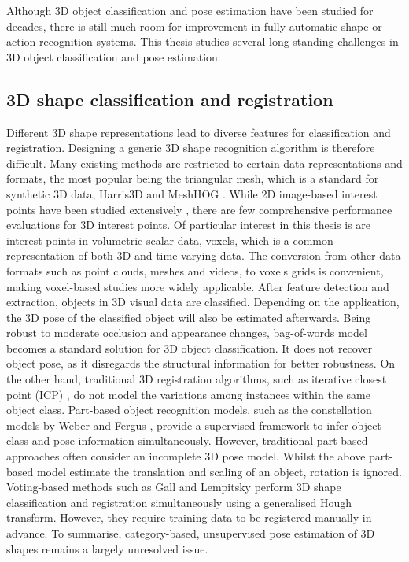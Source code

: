 Although 3D object classification and pose estimation have been studied for decades, there is still much room for improvement in fully-automatic shape or action recognition systems. 
This thesis studies several long-standing challenges in 3D object classification and pose estimation.  

\subsection{3D shape classification and registration} 

Different 3D shape representations lead to diverse features for classification and registration. Designing a generic 3D shape recognition algorithm is therefore difficult. Many existing methods are restricted to certain data representations and formats, the most popular being the triangular mesh, which is a standard for synthetic 3D data, \eg Harris3D \cite{Sipiran2011} and MeshHOG \cite{Zaharescu2009}.     
While 2D image-based interest points have been studied extensively \cite{Mikolajczyk2005}, there are few comprehensive performance evaluations for 3D interest points. 
Of particular interest in this thesis is are interest points in volumetric scalar data, \ie voxels, which is a common representation of both 3D and time-varying data. 
The conversion from other data formats such as point clouds, meshes and videos, to voxels grids is convenient, making voxel-based studies more widely applicable. 
After feature detection and extraction, objects in 3D visual data are classified.  
Depending on the application, the 3D pose of the classified object will also be estimated afterwards. 
Being robust to moderate occlusion and appearance changes, bag-of-words model becomes a standard solution for 3D object classification. It does not recover object pose, as it disregards the structural information for better robustness. 
On the other hand, traditional 3D registration algorithms, such as iterative closest point (ICP) \cite{Besl1992}, do not model the variations among instances within the same object class.
Part-based object recognition models, such as the constellation models by Weber \etal \cite{Weber2000} and Fergus \etal \cite{Fergus2007}, provide a supervised framework to infer object class and pose information simultaneously. However, traditional part-based approaches often consider an incomplete 3D pose model. Whilst the above part-based model estimate the translation and scaling of an object, rotation is ignored.      
Voting-based methods such as Gall and Lempitsky \cite{Gall2009a} perform 3D shape classification and registration simultaneously using a generalised Hough transform. However, they require training data to be registered manually in advance.  
To summarise, category-based, unsupervised pose estimation of 3D shapes remains a largely unresolved issue. 

